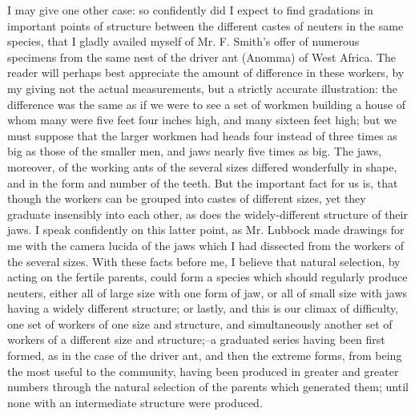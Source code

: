 I may give one other case: so confidently did I expect to find gradations in important points of structure between the different castes of neuters in the same species, that I gladly availed myself of Mr. F. Smith's offer of numerous specimens from the same nest of the driver ant (Anomma) of West Africa. The reader will perhaps best appreciate the amount of difference in these workers, by my giving not the actual measurements, but a strictly accurate illustration: the difference was the same as if we were to see a set of workmen building a house of whom many were five feet four inches high, and many sixteen feet high; but we must suppose that the larger workmen had heads four instead of three times as big as those of the smaller men, and jaws nearly five times as big. The jaws, moreover, of the working ants of the several sizes differed wonderfully in shape, and in the form and number of the teeth. But the important fact for us is, that though the workers can be grouped into castes of different sizes, yet they graduate insensibly into each other, as does the widely-different structure of their jaws. I speak confidently on this latter point, as Mr. Lubbock made drawings for me with the camera lucida of the jaws which I had dissected from the workers of the several sizes.
With these facts before me, I believe that natural selection, by acting on the fertile parents, could form a species which should regularly produce neuters, either all of large size with one form of jaw, or all of small size with jaws having a widely different structure; or lastly, and this is our climax of difficulty, one set of workers of one size and structure, and simultaneously another set of workers of a different size and structure;--a graduated series having been first formed, as in the case of the driver ant, and then the extreme forms, from being the most useful to the community, having been produced in greater and greater numbers through the natural selection of the parents which generated them; until none with an intermediate structure were produced.
